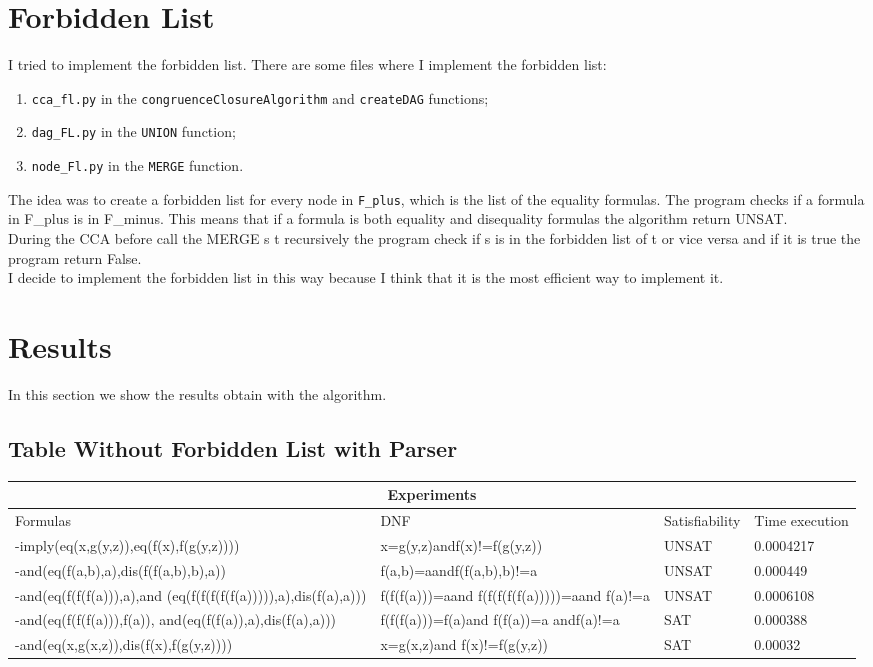 \documentclass{article}
\begin{document}
\section{Forbidden List}
I tried to implement the forbidden list. There are some files where I implement the forbidden list:
\begin{enumerate}
    \item \texttt{cca\_fl.py} in the \texttt{congruenceClosureAlgorithm} and \texttt{createDAG} functions;
    \item \texttt{dag\_FL.py} in the \texttt{UNION} function;
    \item \texttt{node\_Fl.py} in the \texttt{MERGE} function.
\end{enumerate}
The idea was to create a forbidden list for every node in \texttt{F\_plus}, which is the list of the equality
formulas. The program checks if a formula in F\_plus is in F\_minus. This means that if a formula is both equality 
and disequality formulas the algorithm return UNSAT.\\
During the CCA before call the MERGE s t recursively the program check if s is in the forbidden list of t or vice versa
and if it is true the program return False.\\
I decide to implement the forbidden list in this way because I think that it is the most efficient way to implement it.


\section{Results}

In this section we show the results obtain with the algorithm.

\subsection{Table Without Forbidden List with Parser}
\begin{tabular}{ |p{6cm}||p{4.5cm}|p{3cm}|p{3cm}|  }
 \hline
 \multicolumn{4}{|c|}{Experiments} \\
 \hline
 Formulas & DNF &Satisfiability&Time execution\\
 \hline
 -imply(eq(x,g(y,z)),eq(f(x),f(g(y,z))))   & x=g(y,z)andf(x)!=f(g(y,z)) &UNSAT&  0.0004217\\
 -and(eq(f(a,b),a),dis(f(f(a,b),b),a))&  f(a,b)=aandf(f(a,b),b)!=a  & UNSAT   &0.000449\\
 -and(eq(f(f(f(a))),a),and (eq(f(f(f(f(f(a))))),a),dis(f(a),a))) &f(f(f(a)))=aand f(f(f(f(f(a)))))=a\space and f(a)!=a & UNSAT&  0.0006108\\
 -and(eq(f(f(f(a))),f(a)), and(eq(f(f(a)),a),dis(f(a),a))) &f(f(f(a)))=f(a)and f(f(a))=a andf(a)!=a & SAT&  0.000388\\
 -and(eq(x,g(x,z)),dis(f(x),f(g(y,z))))& x=g(x,z)and f(x)!=f(g(y,z)) & SAT&0.00032\\
 \hline
\end{tabular}
\end{document}
